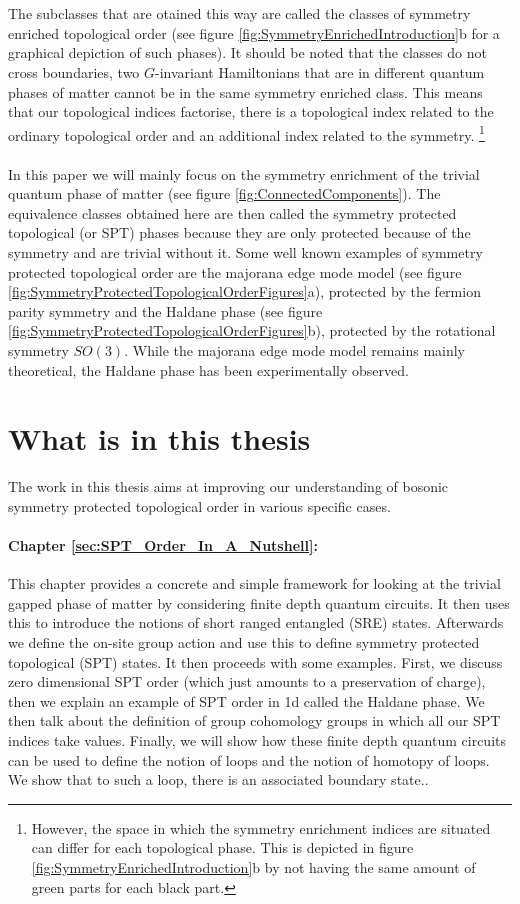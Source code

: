 \\\\
The subclasses that are otained this way are called the classes of symmetry enriched topological order (see figure \ref{fig:SymmetryEnrichedIntroduction}b for a graphical depiction of such phases). It should be noted that the classes do not cross boundaries, two $G$-invariant Hamiltonians that are in different quantum phases of matter cannot be in the same symmetry enriched class. This means that our topological indices factorise, there is a topological index related to the ordinary topological order and an additional index related to the symmetry. \footnote{However, the space in which the symmetry enrichment indices are situated can differ for each topological phase. This is depicted in figure \ref{fig:SymmetryEnrichedIntroduction}b by not having the same amount of green parts for each black part.}
\\\\
In this paper we will mainly focus on the symmetry enrichment of the trivial quantum phase of matter (see figure \ref{fig:ConnectedComponents}). The equivalence classes obtained here are then called the symmetry protected topological (or SPT) phases because they are only protected because of the symmetry and are trivial without it. Some well known examples of symmetry protected topological order are the majorana edge mode model (see figure \ref{fig:SymmetryProtectedTopologicalOrderFigures}a), protected by the fermion parity symmetry and the Haldane phase (see figure \ref{fig:SymmetryProtectedTopologicalOrderFigures}b), protected by the rotational symmetry $SO(3)$. While the majorana edge mode model remains mainly theoretical, the Haldane phase has been experimentally\cite{sompet2022realizing} observed.

\section{What is in this thesis}
The work in this thesis aims at improving our understanding of bosonic symmetry protected topological order in various specific cases.
\paragraph{Chapter \ref{sec:SPT_Order_In_A_Nutshell}:}This chapter provides a concrete and simple framework for looking at the trivial gapped phase of matter by considering finite depth quantum circuits. It then uses this to introduce the notions of short ranged entangled (SRE) states. Afterwards we define the on-site group action and use this to define symmetry protected topological (SPT) states. It then proceeds with some examples. First, we discuss zero dimensional SPT order (which just amounts to a preservation of charge), then we explain an example of SPT order in 1d called the Haldane phase. We then talk about the definition of group cohomology groups in which all our SPT indices take values. Finally, we will show how these finite depth quantum circuits can be used to define the notion of loops and the notion of homotopy of loops. We show that to such a loop, there is an associated boundary state..
